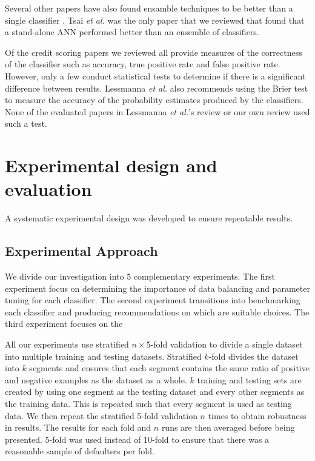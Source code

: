 \documentclass{sig-alternate-05-2015}
\begin{document}
	Several other papers have also found ensamble techniques to be better than a single classifier \cite{Hsieh2010534, Nanni20093028, Twala20103326, Wang2011223}. Tsai \textit{et al.} \cite{Tsai20082639} was the only paper that we reviewed that found that a stand-alone ANN performed better than an ensemble of classifiers.
	
	Of the credit scoring papers we reviewed \cite{Abdou2016, Angelini2008733, Bekhet201420, Danenas20153194, Desai199624, Hsieh2010534, Huang2004543, Huang2007847, Lee2002245, Li2006772, Luo20097562, Malhotra200383, Nanni20093028, Tsai20082639, Twala20103326, Wang2011223} all provide measures of the correctness of the classifier such as accuracy, true positive rate and false positive rate. However, only a few \cite{Desai199624, Huang2004543, Malhotra200383, Wang2011223} conduct statistical tests to determine if there is a significant difference between results. Lessmanna \textit{et al.} also recommends using the Brier test to measure the accuracy of the probability estimates produced by the classifiers. None of the evaluated papers in Lessmanna \textit{et al.}'s review or our own review used such a test.
	
	\section{Experimental design and evaluation}
	A systematic experimental design was developed to ensure repeatable results.
	\subsection{Experimental Approach}
	\label{method-approach}
	We divide our investigation into 5 complementary experiments. The first experiment focus on determining the importance of data balancing and parameter tuning for each classifier. The second experiment transitions into benchmarking each classifier and producing recommendations on which are suitable choices. The third experiment focuses on the 
	
	All our experiments use stratified $n\times$5-fold validation to divide a single dataset into multiple training and testing datasets. Stratified $k$-fold divides the dataset into $k$ segments and ensures that each segment contains the same ratio of positive and negative examples as the dataset as a whole. $k$ training and testing sets are created by using one segment as the testing dataset and every other segments as the training data. This is repeated such that every segment is used as testing data. We then repeat the stratified 5-fold validation $n$ times to obtain robustness in results. The results for each fold and $n$ runs are then averaged before being presented. 5-fold was used instead of 10-fold to ensure that there was a reasonable sample of defaulters per fold.
	
\end{document}
